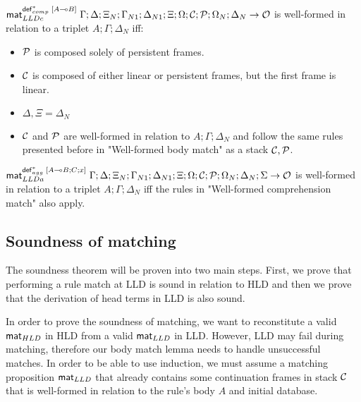 \begin{definition}
$\mathsf{mat}_{LLDc}^{\mathsf{def}_{comp}^{*} \; [A \multimap B]} \; \Gamma; \Delta; \Xi_N; \Gamma_{N1}; \Delta_{N1}; \Xi;
\Omega; \mathcal{C}; \mathcal{P}; \Omega_N; \Delta_N \rightarrow \mathcal{O}$ is
well-formed in relation to a triplet $A; \Gamma; \Delta_{N}$ iff:

\begin{itemize}[leftmargin=*]
   \item $\mathcal{P}$ is composed solely of persistent frames.
   \item $\mathcal{C}$ is composed of either linear or persistent frames, but the first
   frame is linear.
   \item $\Delta, \Xi = \Delta_{N}$
   \item $\mathcal{C}$ and $\mathcal{P}$ are well-formed in relation to $A; \Gamma; \Delta_{N}$ and
   follow the same rules presented before in "Well-formed body match" as a stack
   $\mathcal{C}, \mathcal{P}$.
\end{itemize}
\end{definition}

\begin{definition}
$\mathsf{mat}_{LLDa}^{\mathsf{def}_{agg}^{*} \; [A \multimap B ; C; x]} \; \Gamma; \Delta; \Xi_N; \Gamma_{N1}; \Delta_{N1}; \Xi;
   \Omega; \mathcal{C}; \mathcal{P}; \Omega_N; \Delta_N; \Sigma \rightarrow \mathcal{O}$ is
well-formed in relation to a triplet $A; \Gamma; \Delta_{N}$ iff the rules in
"Well-formed comprehension match" also apply.

\end{definition}


\subsection{Soundness of matching}

The soundness theorem will be proven into two main steps. First, we prove that
performing a rule match at LLD is sound in relation to HLD and then we prove
that the derivation of head terms in LLD is also sound.

In order to prove the soundness of matching, we want to reconstitute a valid
$\mathsf{mat}_{HLD} \;$in HLD from a valid $\mathsf{mat}_{LLD} \;$in LLD. However, LLD may fail during matching,
therefore our body match lemma needs to handle unsuccessful matches. In order to
be able to use induction, we must assume a matching proposition $\mathsf{mat}_{LLD} \;$that
already contains some continuation frames in stack $\mathcal{C}$ that is
well-formed in relation to the rule's body $A$ and initial database.

